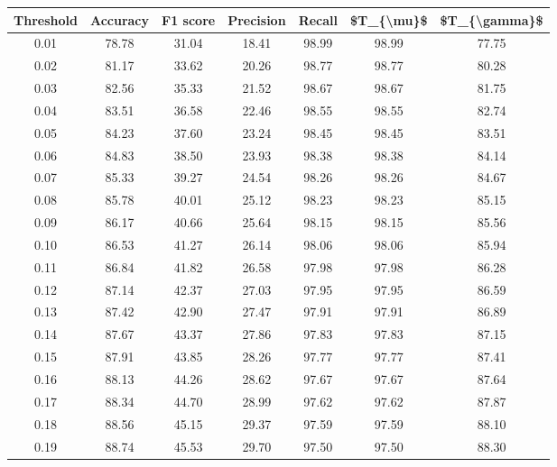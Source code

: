 \begin{tabular}{|c|c|c|c|c|c|c|}
\hline
 Threshold &  Accuracy &  F1 score &  Precision &  Recall &  \$T\_\{\textbackslash mu\}\$ &  \$T\_\{\textbackslash gamma\}\$ \\
\hline
      0.01 &     78.78 &     31.04 &      18.41 &   98.99 &      98.99 &         77.75 \\
      0.02 &     81.17 &     33.62 &      20.26 &   98.77 &      98.77 &         80.28 \\
      0.03 &     82.56 &     35.33 &      21.52 &   98.67 &      98.67 &         81.75 \\
      0.04 &     83.51 &     36.58 &      22.46 &   98.55 &      98.55 &         82.74 \\
      0.05 &     84.23 &     37.60 &      23.24 &   98.45 &      98.45 &         83.51 \\
      0.06 &     84.83 &     38.50 &      23.93 &   98.38 &      98.38 &         84.14 \\
      0.07 &     85.33 &     39.27 &      24.54 &   98.26 &      98.26 &         84.67 \\
      0.08 &     85.78 &     40.01 &      25.12 &   98.23 &      98.23 &         85.15 \\
      0.09 &     86.17 &     40.66 &      25.64 &   98.15 &      98.15 &         85.56 \\
      0.10 &     86.53 &     41.27 &      26.14 &   98.06 &      98.06 &         85.94 \\
      0.11 &     86.84 &     41.82 &      26.58 &   97.98 &      97.98 &         86.28 \\
      0.12 &     87.14 &     42.37 &      27.03 &   97.95 &      97.95 &         86.59 \\
      0.13 &     87.42 &     42.90 &      27.47 &   97.91 &      97.91 &         86.89 \\
      0.14 &     87.67 &     43.37 &      27.86 &   97.83 &      97.83 &         87.15 \\
      0.15 &     87.91 &     43.85 &      28.26 &   97.77 &      97.77 &         87.41 \\
      0.16 &     88.13 &     44.26 &      28.62 &   97.67 &      97.67 &         87.64 \\
      0.17 &     88.34 &     44.70 &      28.99 &   97.62 &      97.62 &         87.87 \\
      0.18 &     88.56 &     45.15 &      29.37 &   97.59 &      97.59 &         88.10 \\
      0.19 &     88.74 &     45.53 &      29.70 &   97.50 &      97.50 &         88.30 \\

\end{tabular}

